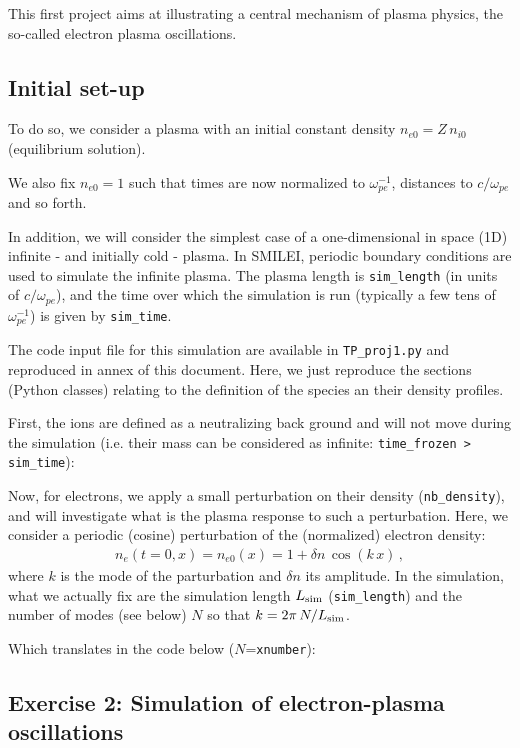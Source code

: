 \documentclass[11pt,a4paper]{article}
\let\oldlstinputlisting
\renewcommand{}[2][]{%
    \oldlstinputlisting[caption={\texttt{\detokenize{#2}}},#1]{#2}%
}
\begin{document}
This first project aims at illustrating a central mechanism of plasma physics, the so-called electron plasma oscillations.

\subsection*{Initial set-up}
To do so, we consider a plasma with an initial  constant density $n_{e0} = Z\,n_{i0}$ (equilibrium solution).

We also fix $n_{e0}=1$ such that times are now normalized to $\omega_{pe}^{-1}$, distances to $c/\omega_{pe}$ and so forth.

In addition, we will consider the simplest case of a one-dimensional in space (1D) infinite - and initially cold - plasma.
In SMILEI, periodic boundary conditions are used to simulate the infinite plasma.
The plasma length is \texttt{sim\_length}  (in units of $c/\omega_{pe}$), and the time over which the simulation is run (typically a few tens of $\omega_{pe}^{-1}$) is given by \texttt{sim\_time}. 

The code input file for this simulation are available in \texttt{TP\_proj1.py} and reproduced in annex of this document.
Here, we just reproduce the sections (Python classes) relating to the definition of the species an their density profiles. 

First, the ions are defined as a neutralizing back ground and will not move during the simulation (i.e. their mass can be considered as infinite: \texttt{time\_frozen > sim\_time}):


Now, for electrons, we apply a small perturbation on their density (\texttt{nb\_density}), and will investigate what is the plasma response to such a perturbation.
Here, we consider a periodic (cosine) perturbation of the (normalized) electron density:
\begin{eqnarray}\label{eq_pert}
n_e(t=0,x) = n_{e0}(x) = 1 + \delta n\,\cos(k\,x)\,,
\end{eqnarray}
where $k$ is the mode of the parturbation and $\delta n$ its amplitude. 
In the simulation, what we actually fix are the simulation length $L_{\rm sim}$ (\texttt{sim\_length}) and the number of modes (see below) $N$ so that $k=2\pi\,N/L_{\rm sim}$.

Which translates in the code below ($N$=\texttt{xnumber}):



\subsection*{Exercise 2: Simulation of electron-plasma oscillations}
\end{document}
